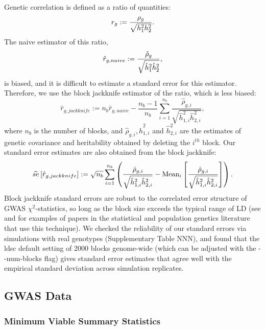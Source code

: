 \documentclass[11pt]{article}
\numberwithin{equation}{section}
\begin{document}
Genetic correlation is defined as a ratio of quantities: 
$$r_g := \frac{\rho_g}{\sqrt{h_{1}^2h_{2}^2}}.$$
The naive estimator of this ratio, 
$$\hat{r}_{g,naive} := \frac{\hat{\rho}_g }{ \sqrt{\hat{h}^2_1\hat{h}^2_2}},$$
is biased, and it is difficult to estimate a standard error for this estimator. 
Therefore, we use the block jackknife estimator of the ratio,
which is less biased:
$$
\hat{r}_{g,jackknife} := 
n_b\hat{r}_{g,naive} -
 \frac{n_b-1}{n_b}
 \sum_{i=1}^{n_b}
 	\frac{\hat{\rho}_{g,i} }
		{ \sqrt{\hat{h}^2_{1,i}\hat{h}^2_{2,i}}},
$$
where $n_b$ is the number of blocks, and $\hat{\rho}_{g,i}, \hat{h}^2_{1,i}$ and $\hat{h}^2_{2,i}$
are the estimates of genetic covariance and heritability obtained by deleting the $i^{th}$ block.
Our standard error estimates are also obtained from the block jackknife:
$$
\widehat{se}\left[\hat{r}_{g,jackknife}\right] := 
\sqrt{n_b} \sum_{i=1}^{n_b} \left(
 	\frac{\hat{\rho}_{g,i} }
		{ \sqrt{\hat{h}^2_{1,i}\hat{h}^2_{2,i}}} - \mathrm{Mean}_i\left[
			\frac{\hat{\rho}_{g,i} }
			{ \sqrt{\hat{h}^2_{1,i}\hat{h}^2_{2,i}}}\right]
	\right).
$$
Block jackknife standard errors are robust to the  correlated error structure 
of GWAS $\chi^2$-statistics, 
so long as the block size exceeds the typical range of LD
(see \cite{buliksullivan2014} and \cite{moorjani2011history} 
for examples of papers in the statistical and population genetics literature that use this technique). 
We checked the reliability of our standard errors via simulations with real genotypes
(Supplementary Table NNN),
and found that the ldsc default setting  of 2000 blocks genome-wide
(which can be adjusted with the {-}{-}num-blocks flag) gives standard error estimates
that agree well with the empirical standard deviation across simulation replicates.


\subsection{GWAS Data}

\subsubsection{Minimum Viable Summary Statistics}
\end{document}
